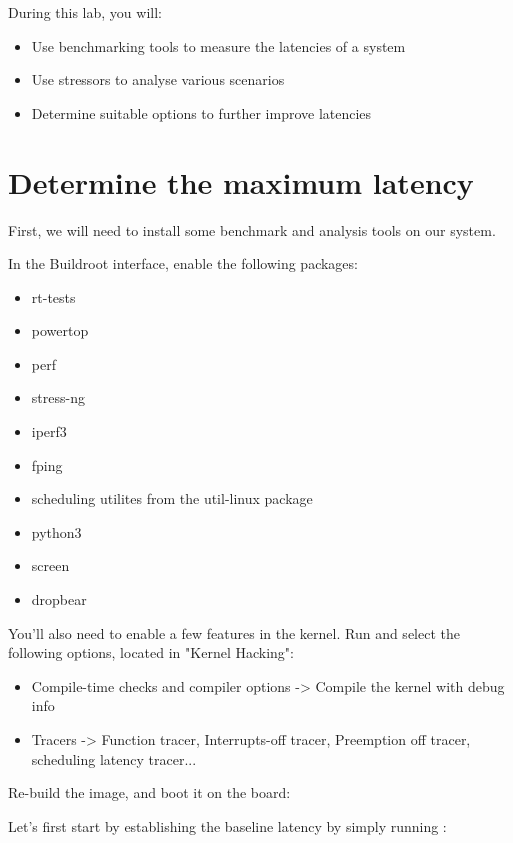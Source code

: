 
During this lab, you will:
\begin{itemize}
  \item Use benchmarking tools to measure the latencies of a system
  \item Use stressors to analyse various scenarios
  \item Determine suitable options to further improve latencies
\end{itemize}

\section{Determine the maximum latency}

First, we will need to install some benchmark and analysis tools on our system.

In the Buildroot  interface, enable the following packages:

\begin{itemize}
	\item rt-tests
	\item powertop
	\item perf
	\item stress-ng
	\item iperf3
	\item fping
	\item scheduling utilites from the util-linux package
	\item python3
	\item screen
	\item dropbear
\end{itemize}

You'll also need to enable a few features in the kernel. Run  and select
the following options, located in "Kernel Hacking":

\begin{itemize}
	\item Compile-time checks and compiler options -> Compile the kernel with debug info
	\item Tracers -> Function tracer, Interrupts-off tracer, Preemption off tracer, scheduling latency tracer...
\end{itemize}

Re-build the image, and boot it on the board: 

Let's first start by establishing the baseline latency by simply running :

